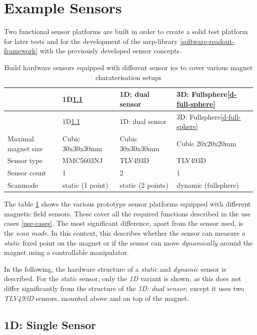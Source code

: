 \hypertarget{example-sensors}{%
\section{Example Sensors}\label{example-sensors}}

Two functional sensor platforms are built in order to create a solid
test platform for later tests and for the development of the
\gls{mrp}-library \ref{software-readout-framework} with the previously
developed sensor concepts.

\begin{longtable}[]{@{}llll@{}}
\caption{Build hardware sensors equipped with different sensor \gls{ic}s
to cover various magnet charaterisation setups
\label{Build_hardware_sensors_equipped_with_different_sensor_(+ic)s_to_cover_various_magnet_charaterisation_setups.csv}}\tabularnewline
\toprule
& 1D\ref{d-single-sensor} & 1D: dual sensor & 3D:
Fullsphere\ref{d-full-sphere}\tabularnewline
\midrule
\endfirsthead
\toprule
& 1D\ref{d-single-sensor} & 1D: dual sensor & 3D:
Fullsphere\ref{d-full-sphere}\tabularnewline
\midrule
\endhead
Maximal magnet size & Cubic 30x30x30mm & Cubic 30x30x30mm & Cubic
20x20x20mm\tabularnewline
Sensor type & MMC5603NJ & TLV493D & TLV493D\tabularnewline
Sensor count & 1 & 2 & 1\tabularnewline
Scanmode & static (1 point) & static (2 points) & dynamic
(fullsphere)\tabularnewline
\bottomrule
\end{longtable}

The table
\ref{Build_hardware_sensors_equipped_with_different_sensor_(+ic)s_to_cover_various_magnet_charaterisation_setups.csv}
shows the various prototype sensor platforms equipped with different
magnetic field sensors. These cover all the required functions described
in the use cases \ref{use-cases}. The most significant difference, apart
from the sensor used, is the \emph{scan mode}. In this context, this
describes whether the sensor can measure a \emph{static} fixed point on
the magnet or if the sensor can move \emph{dynamically} around the
magnet using a controllable manipulator.

In the following, the hardware structure of a \emph{static} and
\emph{dynamic} sensor is described. For the \emph{static} sensor, only
the \emph{1D} variant is shown, as this does not differ significantly
from the structure of the \emph{1D: dual sensor}, except it uses two
\emph{TLV493D} sensors, mounted above and on top of the magnet.

\hypertarget{d-single-sensor}{%
\subsection{1D: Single Sensor}\label{d-single-sensor}}

